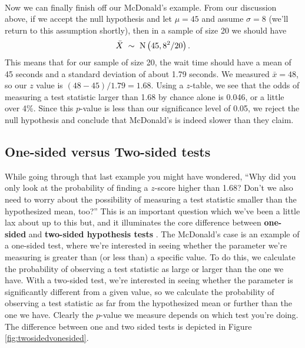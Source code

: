 \ \\

Now \ex we can finally finish off our McDonald's example. From our discussion above, if we accept the null hypothesis and let $\mu=45$ and assume $\sigma=8$ (we'll return to this assumption shortly), then in a sample of size 20 we should have
\begin{equation*}
\bar{X}\ \sim\ {\rm N}\left(45,8^{2}/20\right).
\end{equation*}
This means that for our sample of size 20, the wait time should have a mean of 45 seconds and a standard deviation of about 1.79 seconds. We measured $\bar{x}=48$, so our $z$ value is $\left(48-45\right)/1.79=1.68$. Using a $z$-table, we see that the odds of measuring a test statistic larger than 1.68 by chance alone is 0.046, or a little over 4\%.  Since this $p$-value is less than our significance level of 0.05, we reject the null hypothesis and conclude that McDonald's is indeed slower than they claim.

\subsection{One-sided versus Two-sided tests}

While going through that last example you might have wondered, ``Why did you only look at the probability of finding a $z$-score higher than 1.68?  Don't we also need to worry about the possibility of measuring a test statistic smaller than the hypothesized mean, too?'' This is an important question which we've been a little lax about up to this but, and it illuminates the core difference between \textbf{one-sided} and \textbf{two-sided hypothesis tests} . The McDonald's case is an example of a one-sided test, where we're interested in seeing whether the parameter we're measuring is greater than (or less than) a specific value. To do this, we calculate the probability of observing a test statistic as large or larger than the one we have. With a two-sided test, we're interested in seeing whether the parameter is significantly different from a given value, so we calculate the probability of observing a test statistic as far from the hypothesized mean or further than the one we have. Clearly the $p$-value we measure depends on which test you're doing. The difference between one and two sided tests is depicted in Figure \ref{fig:twosidedvonesided}.

